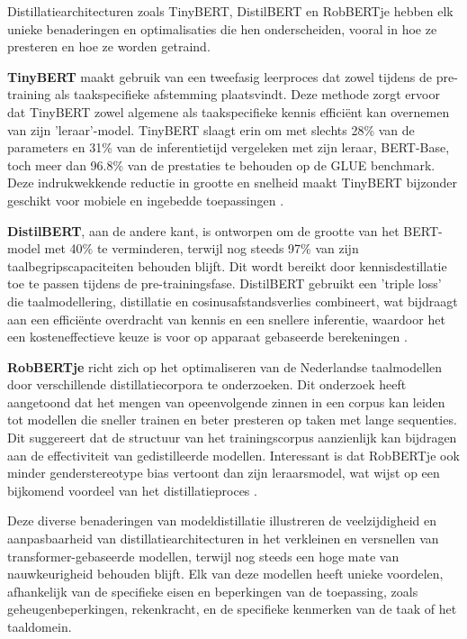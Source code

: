 Distillatiearchitecturen zoals TinyBERT, DistilBERT en RobBERTje hebben elk unie\-ke benaderingen en optimalisaties die hen onderscheiden, vooral in hoe ze presteren en hoe ze worden getraind.

\textbf{TinyBERT} maakt gebruik van een tweefasig leerproces dat zowel tijdens de pre-training als taakspecifieke afstemming plaatsvindt. Deze methode zorgt ervoor dat TinyBERT zowel algemene als taakspecifieke kennis efficiënt kan overnemen van zijn 'leraar'-model. TinyBERT slaagt erin om met slechts 28\% van de parameters en 31\% van de inferentietijd vergeleken met zijn leraar, BERT-Base, toch meer dan 96.8\% van de prestaties te behouden op de GLUE benchmark. Deze indrukwekkende reductie in grootte en snelheid maakt TinyBERT bijzonder geschikt voor mobiele en ingebedde toepassingen \autocite{Jiao2019TinyBERT}.

\textbf{DistilBERT}, aan de andere kant, is ontworpen om de grootte van het BERT-model met 40\% te verminderen, terwijl nog steeds 97\% van zijn taalbegripscapaciteiten behouden blijft. Dit wordt bereikt door kennisdestillatie toe te passen tijdens de pre-trainingsfase. DistilBERT gebruikt een 'triple loss' die taalmodellering, distillatie en cosinusafstandsverlies combineert, wat bijdraagt aan een efficiënte overdracht van kennis en een snellere inferentie, waardoor het een kosteneffectieve keuze is voor op apparaat gebaseerde berekeningen \autocite{Sanh2019DistilBERT}.

\textbf{RobBERTje} richt zich op het optimaliseren van de Nederlandse taalmodellen door verschillende distillatiecorpora te onderzoeken. Dit onderzoek heeft aangetoond dat het mengen van opeenvolgende zinnen in een corpus kan leiden tot modellen die sneller trainen en beter presteren op taken met lange sequenties. Dit suggereert dat de structuur van het trainingscorpus aanzienlijk kan bijdragen aan de effectiviteit van gedistilleerde modellen. Interessant is dat RobBERTje ook minder genderstereotype bias vertoont dan zijn leraarsmodel, wat wijst op een bijkomend voordeel van het distillatieproces \autocite{Delobelle2021}.

Deze diverse benaderingen van modeldistillatie illustreren de veelzijdigheid en aanpasbaarheid van distillatiearchitecturen in het verkleinen en versnellen van trans\-for\-mer-gebaseerde modellen, terwijl nog steeds een hoge mate van nauwkeurigheid behouden blijft. Elk van deze modellen heeft unieke voordelen, afhankelijk van de specifieke eisen en beperkingen van de toepassing, zoals geheugenbeperkingen, rekenkracht, en de specifieke kenmerken van de taak of het taaldomein.


